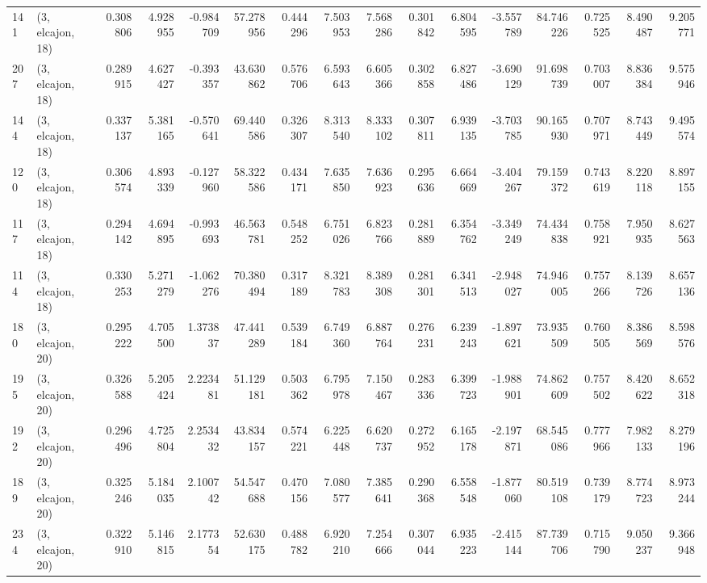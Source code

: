 \begin{tabular}{llrrrrrrrrrrrrrr}
141 &  (3, elcajon, 18) &   0.308806 &   4.928955 & -0.984709 &   57.278956 &  0.444296 &   7.503953 &   7.568286 &  0.301842 &   6.804595 &  -3.557789 &   84.746226 &  0.725525 &   8.490487 &   9.205771 \\
207 &  (3, elcajon, 18) &   0.289915 &   4.627427 & -0.393357 &   43.630862 &  0.576706 &   6.593643 &   6.605366 &  0.302858 &   6.827486 &  -3.690129 &   91.698739 &  0.703007 &   8.836384 &   9.575946 \\
144 &  (3, elcajon, 18) &   0.337137 &   5.381165 & -0.570641 &   69.440586 &  0.326307 &   8.313540 &   8.333102 &  0.307811 &   6.939135 &  -3.703785 &   90.165930 &  0.707971 &   8.743449 &   9.495574 \\
120 &  (3, elcajon, 18) &   0.306574 &   4.893339 & -0.127960 &   58.322586 &  0.434171 &   7.635850 &   7.636923 &  0.295636 &   6.664669 &  -3.404267 &   79.159372 &  0.743619 &   8.220118 &   8.897155 \\
117 &  (3, elcajon, 18) &   0.294142 &   4.694895 & -0.993693 &   46.563781 &  0.548252 &   6.751026 &   6.823766 &  0.281889 &   6.354762 &  -3.349249 &   74.434838 &  0.758921 &   7.950935 &   8.627563 \\
114 &  (3, elcajon, 18) &   0.330253 &   5.271279 & -1.062276 &   70.380494 &  0.317189 &   8.321783 &   8.389308 &  0.281301 &   6.341513 &  -2.948027 &   74.946005 &  0.757266 &   8.139726 &   8.657136 \\
180 &  (3, elcajon, 20) &   0.295222 &   4.705500 &  1.373837 &   47.441289 &  0.539184 &   6.749360 &   6.887764 &  0.276231 &   6.239243 &  -1.897621 &   73.935509 &  0.760505 &   8.386569 &   8.598576 \\
195 &  (3, elcajon, 20) &   0.326588 &   5.205424 &  2.223481 &   51.129181 &  0.503362 &   6.795978 &   7.150467 &  0.283336 &   6.399723 &  -1.988901 &   74.862609 &  0.757502 &   8.420622 &   8.652318 \\
192 &  (3, elcajon, 20) &   0.296496 &   4.725804 &  2.253432 &   43.834157 &  0.574221 &   6.225448 &   6.620737 &  0.272952 &   6.165178 &  -2.197871 &   68.545086 &  0.777966 &   7.982133 &   8.279196 \\
189 &  (3, elcajon, 20) &   0.325246 &   5.184035 &  2.100742 &   54.547688 &  0.470156 &   7.080577 &   7.385641 &  0.290368 &   6.558548 &  -1.877060 &   80.519108 &  0.739179 &   8.774723 &   8.973244 \\
234 &  (3, elcajon, 20) &   0.322910 &   5.146815 &  2.177354 &   52.630175 &  0.488782 &   6.920210 &   7.254666 &  0.307044 &   6.935223 &  -2.415144 &   87.739706 &  0.715790 &   9.050237 &   9.366948 \\

\end{tabular}
